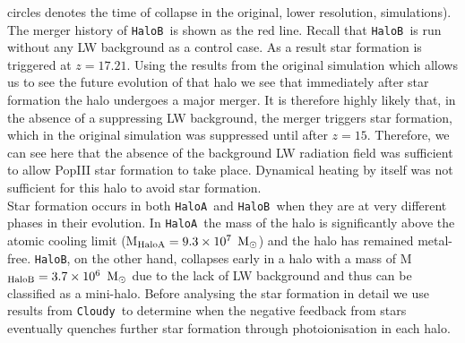 \documentclass[graphics, twocolumn, usenatbib]{mn2e}
\newcommand{\cloudy}{\texttt{Cloudy~}}
\newcommand{\msolar} {$\rm{M_{\odot}}~$}
\newcommand{\msolarc} {$\rm{M_{\odot}}$}
\newcommand{\ha} {\texttt{HaloA~}}
\newcommand{\hb} {\texttt{HaloB~}}
\newcommand{\hbc} {\texttt{HaloB}}
\begin{document}
circles denotes the time of collapse in the original, lower resolution, simulations). The merger
history of \hb is shown as the red line. Recall that \hb is run without any LW background as a control case. As a
result star formation is triggered at $z = 17.21$. Using the results from the original simulation
which allows us to see the future evolution of that halo we see that immediately after star formation
the halo undergoes a major merger. It is therefore highly likely that, in the absence of a suppressing
LW background, the merger triggers star formation, which in the original simulation was
suppressed until after $z = 15$. Therefore, we can see here that the absence of the background
LW radiation field was sufficient to allow PopIII star formation to take place. Dynamical heating
by itself was not sufficient for this halo to avoid star formation. \\
\indent Star formation occurs in both \ha and \hb when they are at very different phases in their evolution.
In \ha the mass of the halo is significantly above the atomic cooling limit
(M$_{\rm{HaloA}} = 9.3 \times 10^7$ \msolarc) and the halo has
remained metal-free. \hbc, on the other hand, collapses early in a
halo with a mass of M$_{\rm{HaloB}} = 3.7 \times 10^6$ \msolar due to the lack of LW background and thus can
be classified as a mini-halo. Before analysing the star formation in detail we use results from \cloudy to determine when the negative feedback from stars eventually
quenches further star formation through photoionisation in each halo. 
\end{document}
